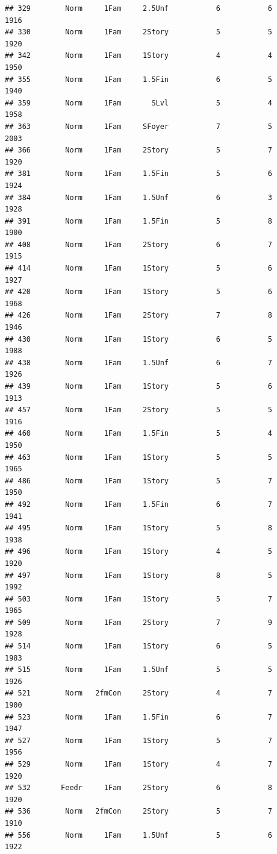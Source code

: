 \documentclass[]{article}
\begin{document}
\begin{verbatim}
## 329        Norm     1Fam     2.5Unf           6           6      1916
## 330        Norm     1Fam     2Story           5           5      1920
## 342        Norm     1Fam     1Story           4           4      1950
## 355        Norm     1Fam     1.5Fin           6           5      1940
## 359        Norm     1Fam       SLvl           5           4      1958
## 363        Norm     1Fam     SFoyer           7           5      2003
## 366        Norm     1Fam     2Story           5           7      1920
## 381        Norm     1Fam     1.5Fin           5           6      1924
## 384        Norm     1Fam     1.5Unf           6           3      1928
## 391        Norm     1Fam     1.5Fin           5           8      1900
## 408        Norm     1Fam     2Story           6           7      1915
## 414        Norm     1Fam     1Story           5           6      1927
## 420        Norm     1Fam     1Story           5           6      1968
## 426        Norm     1Fam     2Story           7           8      1946
## 430        Norm     1Fam     1Story           6           5      1988
## 438        Norm     1Fam     1.5Unf           6           7      1926
## 439        Norm     1Fam     1Story           5           6      1913
## 457        Norm     1Fam     2Story           5           5      1916
## 460        Norm     1Fam     1.5Fin           5           4      1950
## 463        Norm     1Fam     1Story           5           5      1965
## 486        Norm     1Fam     1Story           5           7      1950
## 492        Norm     1Fam     1.5Fin           6           7      1941
## 495        Norm     1Fam     1Story           5           8      1938
## 496        Norm     1Fam     1Story           4           5      1920
## 497        Norm     1Fam     1Story           8           5      1992
## 503        Norm     1Fam     1Story           5           7      1965
## 509        Norm     1Fam     2Story           7           9      1928
## 514        Norm     1Fam     1Story           6           5      1983
## 515        Norm     1Fam     1.5Unf           5           5      1926
## 521        Norm   2fmCon     2Story           4           7      1900
## 523        Norm     1Fam     1.5Fin           6           7      1947
## 527        Norm     1Fam     1Story           5           7      1956
## 529        Norm     1Fam     1Story           4           7      1920
## 532       Feedr     1Fam     2Story           6           8      1920
## 536        Norm   2fmCon     2Story           5           7      1910
## 556        Norm     1Fam     1.5Unf           5           6      1922

\end{verbatim}
\end{document}
